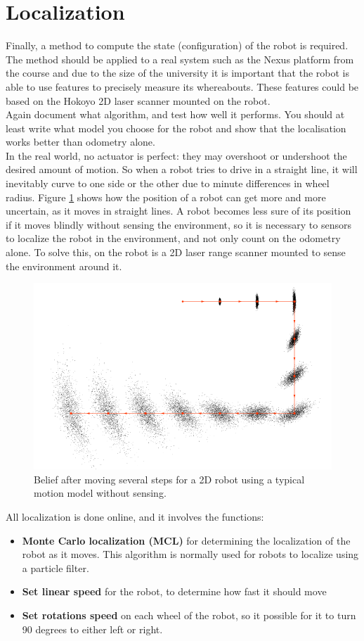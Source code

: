\section{Localization}
\label{sec::localisation}
Finally, a method to compute the state (configuration) of the robot is required. The method should be applied to a real system such as the Nexus platform from the course and due to the size of the university it is important that the robot is able to use features to precisely measure its whereabouts. These features could be based on the Hokoyo 2D laser scanner mounted on the robot.\\[0.2cm]
Again document what algorithm, and test how well it performs. You should at least write what model you choose for the robot and show that the localisation works better than odometry alone.\\[0.2cm]
In the real world, no actuator is perfect: they may overshoot or undershoot the desired amount of motion. So when a robot tries to drive in a straight line, it will inevitably curve to one side or the other due to minute differences in wheel radius. Figure \ref{fig::MC_test} shows how the position of a robot can get more and more uncertain, as it moves in straight lines. A robot becomes less sure of its position if it moves blindly without sensing the environment, so it is necessary to sensors to localize the robot in the environment, and not only count on the odometry alone. To solve this, on the robot is a 2D laser range scanner mounted to sense the environment around it.
\begin{figure}[H]
\centering
\includegraphics[scale=0.43]{img/MCtest.png}
\caption{Belief after moving several steps for a 2D robot using a typical motion model without sensing.}
\label{fig::MC_test}
\end{figure}
All localization is done online, and it involves the functions:
\begin{itemize}\itemsep-2pt
\item \textbf{Monte Carlo localization (MCL)} for determining the localization of the robot as it moves. This algorithm is normally used for robots to localize using a particle filter.
\item \textbf{Set linear speed} for the robot, to determine how fast it should move
\item \textbf{Set rotations speed} on each wheel of the robot, so it possible for it to turn 90 degrees to either left or right.  
\end{itemize}
\newpage
